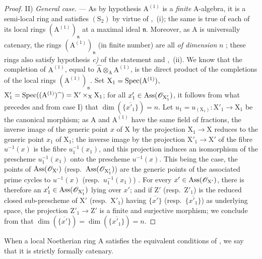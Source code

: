 \begin{proof}
\medskip\noindent
II) \emph{General case.} ---
As by hypothesis $\mathrm{A}^{(1)}$ is a \emph{finite} A-algebra, it is a semi-local ring and satisfies $(\mathrm{S}_2)$ by virtue of ,~(i); the same is true of each of its local rings $({\mathrm{A}^{(1)}})_\mathfrak{n}$ at a maximal ideal $\mathfrak{n}$.
Moreover, as $\mathrm{A}$ is universally catenary, the rings $({\mathrm{A}^{(1)}})_\mathfrak{n}$ (in finite number) are all \emph{of dimension} $n$ ; these rings also satisfy hypothesis \emph{c)} of the statement  and ,~(ii).
We know that the completion of $\mathrm{A}^{(1)}$, equal to $\widehat{\mathrm{A}}\otimes_\mathrm{A}\mathrm{A}^{(1)}$, is the direct product of the completions of the local rings $(\mathrm{A}^{(1)})_\mathfrak{n}$.
Set $\mathrm{X}_1=\operatorname{Spec}(\mathrm{A}^{(1)})$, $\mathrm{X}'_1=\operatorname{Spec}((\mathrm{A}^{(1)})\widehat{\phantom{x}})=\mathrm{X}'\times_\mathrm{X}\mathrm{X}_1$; for all $x'_1\in\operatorname{Ass}(\mathscr{O}_{\mathrm{X}'_1})$, it follows from what precedes and from case I) that $\dim(\overline{\{x'_1\}})=n$.
Let $u_1=u_{(\mathrm{X}_1)}:\mathrm{X}'_1\to\mathrm{X}_1$ be the canonical morphism; as $\mathrm{A}$ and $\mathrm{A}^{(1)}$ have the same field of fractions, the inverse image of the generic point $x$ of $\mathrm{X}$ by the projection $\mathrm{X}_1\to\mathrm{X}$ reduces to the generic point $x_1$ of $\mathrm{X}_1$; the inverse image by the projection $\mathrm{X}'_1\to\mathrm{X}'$ of the fibre $u^{-1}(x)$ is the fibre $u_1^{-1}(x_1)$, and this projection induces an isomorphism of the prescheme $u_1^{-1}(x_1)$ onto the prescheme $u^{-1}(x)$.
This being the case, the points of $\operatorname{Ass}(\mathscr{O}_{\mathrm{X}'})$ (resp.~$\operatorname{Ass}(\mathscr{O}_{\mathrm{X}'_1})$) are the generic points of the associated prime cycles to $u^{-1}(x)$ (resp.~$u_1^{-1}(x_1)$) .
For every $x'\in\operatorname{Ass}(\mathscr{O}_{\mathrm{X}'})$, there is therefore an $x'_1\in\operatorname{Ass}(\mathscr{O}_{\mathrm{X}'_1})$ lying over $x'$; and if $\mathrm{Z}'$ (resp.~$\mathrm{Z}'_1$) is the reduced closed sub-prescheme of $\mathrm{X}'$ (resp.~$\mathrm{X}'_1$) having $\overline{\{x'\}}$ (resp.~$\overline{\{x'_1\}}$) as underlying space, the projection $\mathrm{Z}'_1\to\mathrm{Z}'$ is a finite and surjective morphism; we conclude from  that $\dim(\overline{\{x'\}})=\dim(\overline{\{x'_1\}})=n$.
\end{proof}

\begin{definition}[7.2.6]
\label{IV.7.2.6}
When a local Noetherian ring $\mathrm{A}$ satisfies the equivalent conditions of , we say that it is strictly formally catenary.
\end{definition}

